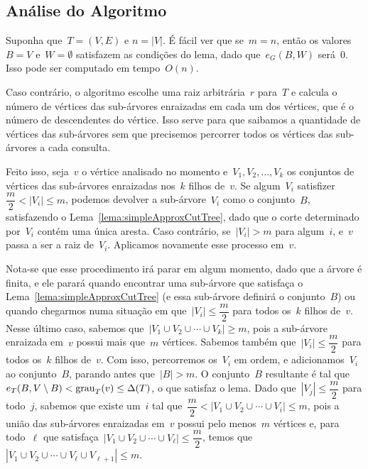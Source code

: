 \bigskip

\subsection*{Análise do Algoritmo}

	Suponha que~$T=(V,E)$ e $n=|V|$.
	É fácil ver que se~$m=n$, então os valores~$B =V$ 
	e~$W =\emptyset$ satisfazem as condições do lema, dado 
	que~$e_G(B,W)$ será~$0$. 
	Isso pode ser computado em tempo~$O(n)$.

	Caso contrário, o algoritmo escolhe uma raiz arbitrária~$r$ 
	para~$T$ e calcula o número de vértices das sub-árvores 
	enraizadas em cada um dos vértices, que é o número de 
	descendentes do vértice.
	Isso serve para que saibamos a quantidade de vértices das 
	sub-árvores sem que precisemos percorrer todos os vértices das 
	sub-árvores a cada consulta.

	Feito isso, seja~$v$ o vértice analisado no momento 
	e~${V_1, V_2, \ldots, V_k}$ os conjuntos de vértices das
	sub-árvores enraizadas 
	nos~$k$ filhos de~$v$.
	Se algum~$V_i$ satisfizer~${\dfrac{m}{2}<|V_i|\le m}$, podemos 
	devolver a sub-árvore~$V_i$ como o conjunto~$B$, 
	satisfazendo o Lema~\ref{lema:simpleApproxCutTree}, dado que o
	corte determinado por~$V_i$ contém uma única aresta. 
	Caso contrário, se~${|V_i|>m}$ para algum~$i$, 
	e~$v$ passa a ser a raiz de~$V_i$.
	Aplicamos novamente esse processo em~$v$.

	Nota-se que esse procedimento irá parar em algum momento, dado 
	que a árvore é finita, e ele parará quando encontrar uma 
	sub-árvore que satisfaça o Lema~\ref{lema:simpleApproxCutTree}
	(e essa sub-árvore definirá o conjunto~$B$) 
	ou quando chegarmos numa situação em 
	que~${|V_i|\le \dfrac{m}{2}}$ para todos os~$k$ filhos de~$v$.
	Nesse último caso, sabemos 
	que~${|V_1\cup V_2\cup \cdots \cup V_k|\ge m}$, pois
	a sub-árvore enraizada em~$v$ possui mais que~$m$ vértices. 
	Sabemos também que~${|V_i|\le \dfrac{m}{2}}$ para todos os~$k$ 
	filhos de~$v$. 
	Com isso, percorremos os~$V_i$ em ordem, e 
	adicionamos~$V_i$ ao conjunto~$B$, parando antes 
	que~${|B| >m}$. 
	O conjunto~$B$ resultante é tal 
	que~${e_T(B,V\setminus B)<\mathrm{grau}_T(v)\le \Delta(T)}$, 
	o que satisfaz o lema.
	Dado que~${|V_j|\le \dfrac{m}{2}}$ para todo~$j$, sabemos que 
	existe um~$i$ tal 
	que~${\dfrac{m}{2} <|V_1\cup V_2 \cup \cdots \cup V_i|\le m}$, 
	pois a união das sub-árvores enraizadas em~$v$ possui pelo 
	menos~$m$ vértices e, para todo~$\ell$ que 
	satisfaça~${|V_1\cup V_2\cup \cdots\cup V_\ell|\le 
	\dfrac{m}{2}}$, temos 
	que~${|V_1\cup V_2\cup\cdots\cup V_\ell\cup V_{\ell+1}|\le m}$.


